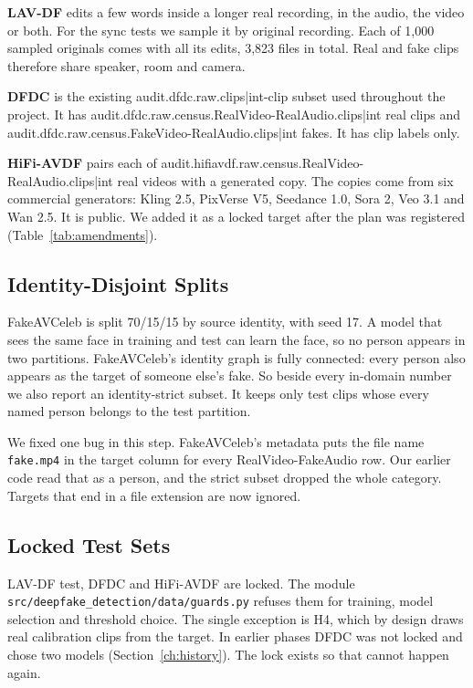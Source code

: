 \textbf{LAV-DF} edits a few words inside a longer real recording, in the audio,
the video or both. For the sync tests we sample it by original recording. Each of 1,000 sampled originals comes with all its
edits, 3,823 files in total. Real and fake clips therefore share speaker, room
and camera.

\textbf{DFDC} is the existing {{audit.dfdc.raw.clips|int}}-clip subset used
throughout the project. It has
{{audit.dfdc.raw.census.RealVideo-RealAudio.clips|int}} real clips and
{{audit.dfdc.raw.census.FakeVideo-RealAudio.clips|int}} fakes. It has clip
labels only.

\textbf{HiFi-AVDF} pairs each of
{{audit.hifiavdf.raw.census.RealVideo-RealAudio.clips|int}} real videos with a
generated copy. The copies come from six commercial generators: Kling 2.5,
PixVerse V5, Seedance 1.0, Sora 2, Veo 3.1 and Wan 2.5. It is public. We added it as a locked target after the plan was registered (Table~\ref{tab:amendments}).

\subsection{Identity-Disjoint Splits}

FakeAVCeleb is split 70/15/15 by source identity, with seed 17. A model that
sees the same face in training and test can learn the face, so no person
appears in two partitions. FakeAVCeleb's identity graph is fully connected:
every person also appears as the target of someone else's fake. So beside
every in-domain number we also report an identity-strict subset. It keeps only
test clips whose every named person belongs to the test partition.

We fixed one bug in this step. FakeAVCeleb's metadata puts the file name
\texttt{fake.mp4} in the target column for every RealVideo-FakeAudio row. Our
earlier code read that as a person, and the strict subset dropped the whole
category. Targets that end in a file extension are now ignored.

\subsection{Locked Test Sets}

LAV-DF test, DFDC and HiFi-AVDF are locked. The module
\texttt{src/\allowbreak deepfake\_detection/\allowbreak data/\allowbreak guards.py} refuses them for training,
model selection and threshold choice. The single exception is H4, which by
design draws real calibration clips from the target. In earlier phases DFDC was
not locked and chose two models (Section~\ref{ch:history}). The lock exists so
that cannot happen again.

